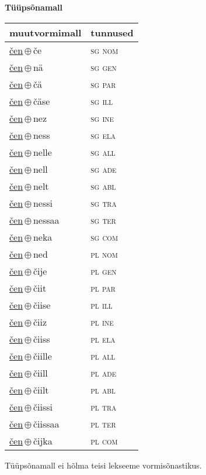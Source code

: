 

\vspace{3.5em}
\noindent \begin{minipage}{\textwidth}
\noindent \textbf{Tüüpsõnamall \,}\\

\begin{sideways}
\begin{tabular}{l l}
muutvormimall & tunnused \\
\hline
\underline{čen}\,$\oplus$\,če & \textsc{ sg nom } \\
\underline{čen}\,$\oplus$\,nä & \textsc{ sg gen } \\
\underline{čen}\,$\oplus$\,čä & \textsc{ sg par } \\
\underline{čen}\,$\oplus$\,čäse & \textsc{ sg ill } \\
\underline{čen}\,$\oplus$\,nez & \textsc{ sg ine } \\
\underline{čen}\,$\oplus$\,ness & \textsc{ sg ela } \\
\underline{čen}\,$\oplus$\,nelle & \textsc{ sg all } \\
\underline{čen}\,$\oplus$\,nell & \textsc{ sg ade } \\
\underline{čen}\,$\oplus$\,nelt & \textsc{ sg abl } \\
\underline{čen}\,$\oplus$\,nessi & \textsc{ sg tra } \\
\underline{čen}\,$\oplus$\,nessaa & \textsc{ sg ter } \\
\underline{čen}\,$\oplus$\,neka & \textsc{ sg com } \\
\underline{čen}\,$\oplus$\,ned & \textsc{ pl nom } \\
\underline{čen}\,$\oplus$\,čije & \textsc{ pl gen } \\
\underline{čen}\,$\oplus$\,čiit & \textsc{ pl par } \\
\underline{čen}\,$\oplus$\,čiise & \textsc{ pl ill } \\
\underline{čen}\,$\oplus$\,čiiz & \textsc{ pl ine } \\
\underline{čen}\,$\oplus$\,čiiss & \textsc{ pl ela } \\
\underline{čen}\,$\oplus$\,čiille & \textsc{ pl all } \\
\underline{čen}\,$\oplus$\,čiill & \textsc{ pl ade } \\
\underline{čen}\,$\oplus$\,čiilt & \textsc{ pl abl } \\
\underline{čen}\,$\oplus$\,čiissi & \textsc{ pl tra } \\
\underline{čen}\,$\oplus$\,čiissaa & \textsc{ pl ter } \\
\underline{čen}\,$\oplus$\,čijka & \textsc{ pl com } \\
\end{tabular}
\end{sideways}
\label{tab:tüüpsõnamall-čenče}

\end{minipage}

 
\vspace{1em}
\noindent Tüüpsõnamall  ei hõlma teisi lekseeme vormi\-sõnastikus.

